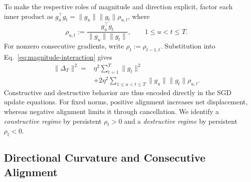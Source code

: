 To make the respective roles of magnitude and direction explicit,
factor each inner product as
$g_u^\top g_t=\|g_u\|\|g_t\|\rho_{u,t}$, where
\begin{equation}
  \rho_{u,t}:=\frac{g_u^\top g_t}{\|g_u\|\|g_t\|},
  \qquad 1\leq u<t\leq T.
  \label{eq:rho}
\end{equation}
For nonzero consecutive gradients, write $\rho_t:=\rho_{t-1,t}$.
Substitution into Eq.~\eqref{eq:magnitude-interaction} gives
\begin{equation}
\begin{aligned}
\|\Delta_T\|^2={}&\eta^2\sum_{t=1}^T\|g_t\|^2\\
 &+2\eta^2\sum_{1\leq u<t\leq T}
    \|g_u\|\|g_t\|\rho_{u,t}.
\end{aligned}
\label{eq:magnitude-alignment}
\end{equation}
Constructive and destructive behavior are thus encoded directly in the
SGD update equations. For fixed norms, positive alignment increases net
displacement, whereas negative alignment limits it through cancellation.
We identify a \emph{constructive regime} by persistent $\rho_t>0$ and
a \emph{destructive regime} by persistent $\rho_t<0$.

\subsection{Directional Curvature and Consecutive Alignment}

